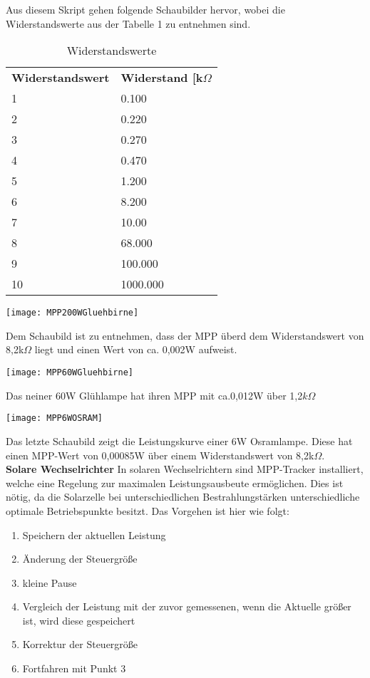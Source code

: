Aus diesem Skript gehen folgende Schaubilder hervor, wobei die Widerstandswerte aus der Tabelle 1 zu entnehmen sind.\\
\begin{table}
\centering
\caption{Widerstandswerte}
\label{tab:Widerstandswerte}
\begin{tabular}{ll}
  \textbf{Widerstandswert} & \textbf{Widerstand [k$\Omega$} \\
  1  & 0.100\\
  2  & 0.220\\
  3  & 0.270\\
  4  & 0.470\\
  5  & 1.200\\
  6  & 8.200\\
  7  & 10.00\\
  8  & 68.000\\
  9  & 100.000\\
  10 & 1000.000\\
 \end{tabular}
\end{table}

\begin{center}
\texttt{[image: MPP200WGluehbirne]}
\end{center}
Dem Schaubild ist zu entnehmen, dass der MPP überd dem Widerstandswert von 8,2k$\Omega$ liegt und einen Wert von ca. 0,002W aufweist.\\
\begin{center}
\texttt{[image: MPP60WGluehbirne]}
\end{center}
Das neiner 60W Glühlampe hat ihren MPP mit ca.0,012W über 1,2$k\Omega$\\
\begin{center}
\texttt{[image: MPP6WOSRAM]}
\end{center}
Das letzte Schaubild zeigt die Leistungskurve einer 6W Osramlampe. Diese hat einen MPP-Wert von 0,00085W über einem Widerstandswert von 8,2k$\Omega$.\\


\textbf{Solare Wechselrichter}
In solaren Wechselrichtern sind MPP-Tracker installiert, welche eine Regelung zur maximalen Leistungsausbeute ermöglichen. Dies ist nötig, da die Solarzelle bei unterschiedlichen Bestrahlungstärken unterschiedliche optimale Betriebspunkte besitzt.
Das Vorgehen ist hier wie folgt:
\begin{enumerate}
 \item Speichern der aktuellen Leistung
 \item Änderung der Steuergröße
 \item kleine Pause
 \item Vergleich der Leistung mit der zuvor gemessenen, wenn die Aktuelle größer ist, wird diese gespeichert
 \item Korrektur der Steuergröße
 \item Fortfahren mit Punkt 3
\end{enumerate}




